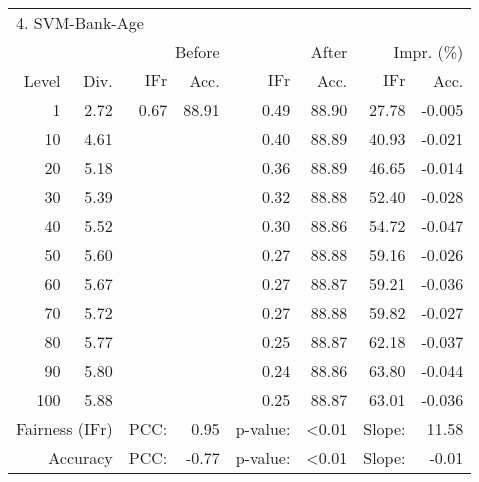 \begin{tabular}{rr||rr|rr|rr}
\multicolumn{4}{l}{4. SVM-Bank-Age} & \multicolumn{2}{c}{} & \multicolumn{2}{c}{}\\
 &  & \multicolumn{2}{r|}{Before} & \multicolumn{2}{r|}{After} & \multicolumn{2}{r}{Impr. (\%)}\\
Level & Div. & $\mathrm{IFr}$ & Acc. & $\mathrm{IFr}$ & Acc. & $\mathrm{IFr}$ & Acc.\\
\hline
1 & 2.72 & 0.67 & 88.91 & 0.49 & 88.90 & 27.78 & -0.005\\
10 & 4.61 &  &  & 0.40 & 88.89 & 40.93 & -0.021\\
20 & 5.18 &  &  & 0.36 & 88.89 & 46.65 & -0.014\\
30 & 5.39 &  &  & 0.32 & 88.88 & 52.40 & -0.028\\
40 & 5.52 &  &  & 0.30 & 88.86 & 54.72 & -0.047\\
50 & 5.60 &  &  & 0.27 & 88.88 & 59.16 & -0.026\\
60 & 5.67 &  &  & 0.27 & 88.87 & 59.21 & -0.036\\
70 & 5.72 &  &  & 0.27 & 88.88 & 59.82 & -0.027\\
80 & 5.77 &  &  & 0.25 & 88.87 & 62.18 & -0.037\\
90 & 5.80 &  &  & 0.24 & 88.86 & 63.80 & -0.044\\
100 & 5.88 &  &  & 0.25 & 88.87 & 63.01 & -0.036\\
\hline
\multicolumn{2}{r}{Fairness ($\mathrm{IFr}$)} & PCC: & 0.95 & p-value:  & <0.01 & Slope:  & 11.58\\
\multicolumn{2}{r}{Accuracy} & PCC: & -0.77 & p-value:  & <0.01 & Slope:  & -0.01\\
\end{tabular}
